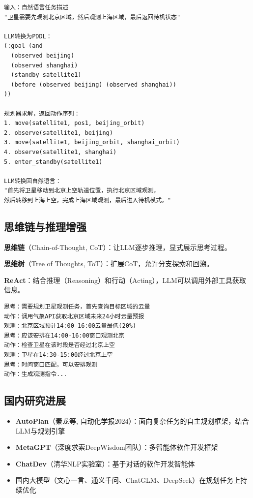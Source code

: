 \begin{lstlisting}[caption=LLM+P流程示例]
输入：自然语言任务描述
"卫星需要先观测北京区域，然后观测上海区域，最后返回待机状态"

LLM转换为PDDL：
(:goal (and
  (observed beijing)
  (observed shanghai)
  (standby satellite1)
  (before (observed beijing) (observed shanghai))
))

规划器求解，返回动作序列：
1. move(satellite1, pos1, beijing_orbit)
2. observe(satellite1, beijing)
3. move(satellite1, beijing_orbit, shanghai_orbit)
4. observe(satellite1, shanghai)
5. enter_standby(satellite1)

LLM转换回自然语言：
"首先将卫星移动到北京上空轨道位置，执行北京区域观测，
然后转移到上海上空，完成上海区域观测，最后进入待机模式。"
\end{lstlisting}

\subsection{思维链与推理增强}

\textbf{思维链}（Chain-of-Thought, CoT）：让LLM逐步推理，显式展示思考过程。

\textbf{思维树}（Tree of Thoughts, ToT）：扩展CoT，允许分支探索和回溯。

\textbf{ReAct}：结合推理（Reasoning）和行动（Acting），LLM可以调用外部工具获取信息。

\begin{example}[ReAct在任务规划中的应用]
\begin{verbatim}
思考：需要规划卫星观测任务，首先查询目标区域的云量
动作：调用气象API获取北京区域未来24小时云量预报
观测：北京区域预计14:00-16:00云量最低(20%)
思考：应该安排在14:00-16:00窗口观测北京
动作：检查卫星在该时段是否经过北京上空
观测：卫星在14:30-15:00经过北京上空
思考：时间窗口匹配，可以安排观测
动作：生成观测指令...
\end{verbatim}
\end{example}

\subsection{国内研究进展}

\begin{appbox}[国内LLM规划研究]
\begin{itemize}
  \item \textbf{AutoPlan}（秦龙等, 自动化学报2024）：面向复杂任务的自主规划框架，结合LLM与规划引擎
  \item \textbf{MetaGPT}（深度求索DeepWisdom团队）：多智能体软件开发框架
  \item \textbf{ChatDev}（清华NLP实验室）：基于对话的软件开发智能体
  \item 国内大模型（文心一言、通义千问、ChatGLM、DeepSeek）在规划任务上持续优化
\end{itemize}
\end{appbox}

